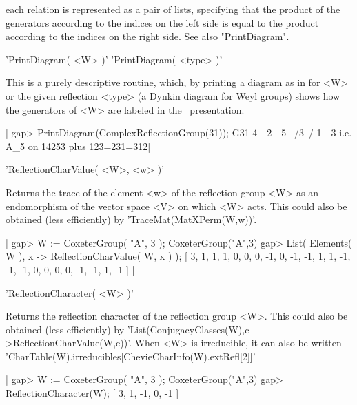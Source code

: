 each relation  is represented as  a pair  of lists, specifying  that the
product of the  generators according to the indices on  the left side is
equal to  the product according  to the indices  on the right  side. See
also "PrintDiagram".

%
%

'PrintDiagram( <W> )'
'PrintDiagram( <type> )'

This is a purely descriptive routine, which, by printing a diagram as in
\cite{BMR98} for  <W> or the  given reflection <type> (a  Dynkin diagram
for Weyl  groups) shows  how the  generators of <W>  are labeled  in the
\CHEVIE\ presentation.

|    gap> PrintDiagram(ComplexReflectionGroup(31));
    G31      4 - 2 - 5
              \ /3\ /
               1 - 3     i.e. A_5 on 14253 plus 123=231=312|


'ReflectionCharValue( <W>, <w> )'

Returns the trace of  the element <w> of the reflection  group <W> as an
endomorphism of the vector space <V>  on which <W> acts. This could also
be obtained (less efficiently) by 'TraceMat(MatXPerm(W,w))'.

|    gap> W := CoxeterGroup( "A", 3 );
    CoxeterGroup("A",3)
    gap> List( Elements( W ), x -> ReflectionCharValue( W, x ) );
    [ 3, 1, 1, 1, 0, 0, 0, -1, 0, -1, -1, 1, 1, -1, -1, -1, 0, 0, 0, 0,
      -1, -1, 1, -1 ] |


'ReflectionCharacter( <W> )'

Returns  the reflection character  of the reflection  group <W>. This could
also be obtained (less efficiently) by
'List(ConjugacyClasses(W),c->ReflectionCharValue(W,c))'.    When   <W>   is
irreducible, it can also be written
'CharTable(W).irreducibles[ChevieCharInfo(W).extRefl[2]]'

|    gap> W := CoxeterGroup( "A", 3 );
    CoxeterGroup("A",3)
    gap> ReflectionCharacter(W);
    [ 3, 1, -1, 0, -1 ] |


